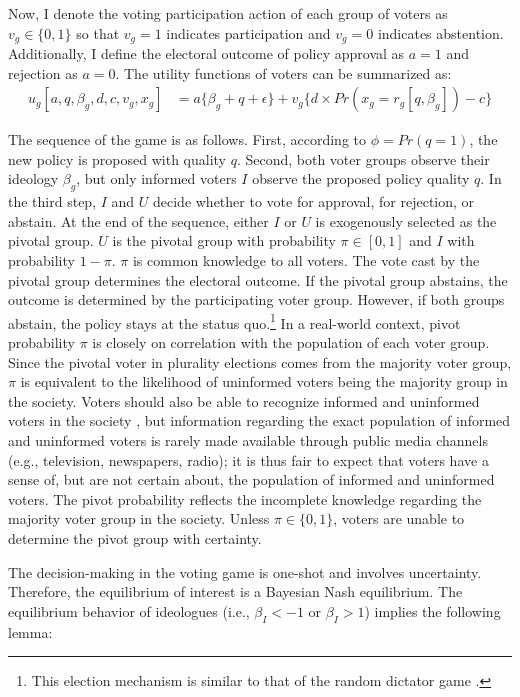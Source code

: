 \documentclass[letterpaper, 12pt]{article}
\begin{document}
    \par Now, I denote the voting participation action of each group of voters as $v_g \in \{0,1\}$ so that $v_g=1$ indicates participation and $v_g=0$ indicates abstention. Additionally, I define the electoral outcome of policy approval as $a=1$ and rejection as $a=0$. The utility functions of voters can be summarized as:
    \begin{align}
    u_g [a,q,\beta_g,d,c,v_g,x_g] &= a\{\beta_g + q + \epsilon\} + v_g \{d \times Pr(x_g=r_g[q, \beta_g]) - c \} \label{uf}
    \end{align}
    
    \par The sequence of the game is as follows. First, according to $\phi = Pr(q=1)$, the new policy is proposed with quality $q$. Second, both voter groups observe their ideology $\beta_g$, but only informed voters $I$ observe the proposed policy quality $q$. In the third step, $I$ and $U$ decide whether to vote for approval, for rejection, or abstain. At the end of the sequence, either $I$ or $U$ is exogenously selected as the pivotal group. $U$ is the pivotal group with probability $\pi \in [0, 1]$ and $I$ with probability $1-\pi$. $\pi$ is common knowledge to all voters. The vote cast by the pivotal group determines the electoral outcome. If the pivotal group abstains, the outcome is determined by the participating voter group. However, if both groups abstain, the policy stays at the status quo.\footnote{This election mechanism is similar to that of the random dictator game \citep{Morton2015whmo}.} In a real-world context, pivot probability $\pi$ is closely on correlation with the population of each voter group. Since the pivotal voter in plurality elections comes from the majority voter group, $\pi$ is equivalent to the likelihood of uninformed voters being the majority group in the society. Voters should also be able to recognize informed and uninformed voters in the society \citep{Huckfeldt2001thso}, but information regarding the exact population of informed and uninformed voters is rarely made available through public media channels (e.g., television, newspapers, radio); it is thus fair to expect that voters have a sense of, but are not certain about, the population of informed and uninformed voters. The pivot probability reflects the incomplete knowledge regarding the majority voter group in the society. Unless $\pi \in \{0, 1\}$, voters are unable to determine the pivot group with certainty.
    
    
    \par The decision-making in the voting game is one-shot and involves uncertainty. Therefore, the equilibrium of interest is a Bayesian Nash equilibrium. The equilibrium behavior of ideologues (i.e., $\beta_I < -1$ or $\beta_I > 1$) implies the following lemma:
    
\end{document}
